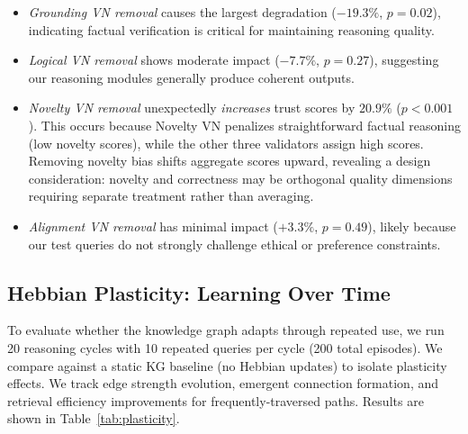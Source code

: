 \documentclass{article}
\begin{document}
\begin{itemize}
    \item \textit{Grounding VN removal} causes the largest degradation ($-19.3\%$, $p = 0.02$), indicating factual verification is critical for maintaining reasoning quality.
    \item \textit{Logical VN removal} shows moderate impact ($-7.7\%$, $p = 0.27$), suggesting our reasoning modules generally produce coherent outputs.
    \item \textit{Novelty VN removal} unexpectedly \textit{increases} trust scores by $20.9\%$ ($p < 0.001$). This occurs because Novelty VN penalizes straightforward factual reasoning (low novelty scores), while the other three validators assign high scores. Removing novelty bias shifts aggregate scores upward, revealing a design consideration: novelty and correctness may be orthogonal quality dimensions requiring separate treatment rather than averaging.
    \item \textit{Alignment VN removal} has minimal impact ($+3.3\%$, $p = 0.49$), likely because our test queries do not strongly challenge ethical or preference constraints.
\end{itemize}

\subsection{Hebbian Plasticity: Learning Over Time}

To evaluate whether the knowledge graph adapts through repeated use, we run 20 reasoning cycles with 10 repeated queries per cycle (200 total episodes). We compare against a static KG baseline (no Hebbian updates) to isolate plasticity effects. We track edge strength evolution, emergent connection formation, and retrieval efficiency improvements for frequently-traversed paths. Results are shown in Table~\ref{tab:plasticity}.
\end{document}
